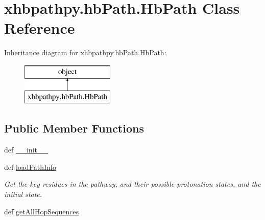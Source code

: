 \hypertarget{classxhbpathpy_1_1hb_path_1_1_hb_path}{\section{xhbpathpy.\-hb\-Path.\-Hb\-Path Class Reference}
\label{classxhbpathpy_1_1hb_path_1_1_hb_path}
}
Inheritance diagram for xhbpathpy.\-hb\-Path.\-Hb\-Path\-:\begin{figure}[H]
\begin{center}
\leavevmode
\includegraphics[height=2.000000cm]{classxhbpathpy_1_1hb_path_1_1_hb_path}
\end{center}
\end{figure}
\subsection*{Public Member Functions}
\begin{DoxyCompactItemize}
\item 
def \hyperlink{classxhbpathpy_1_1hb_path_1_1_hb_path_a5cb2ae7828572deb15b94fdd9b084905}{\-\_\-\-\_\-init\-\_\-\-\_\-}
\item 
def \hyperlink{classxhbpathpy_1_1hb_path_1_1_hb_path_a38b970ba1a1d898b8e6893051b2fb931}{load\-Path\-Info}
\begin{DoxyCompactList}\small\item\em Get the key residues in the pathway, and their possible protonation states, and the initial state. \end{DoxyCompactList}\item 
def \hyperlink{classxhbpathpy_1_1hb_path_1_1_hb_path_a377bdea72f8fd3afd312667ede3e08b7}{get\-All\-Hop\-Sequences}
\end{DoxyCompactItemize}
